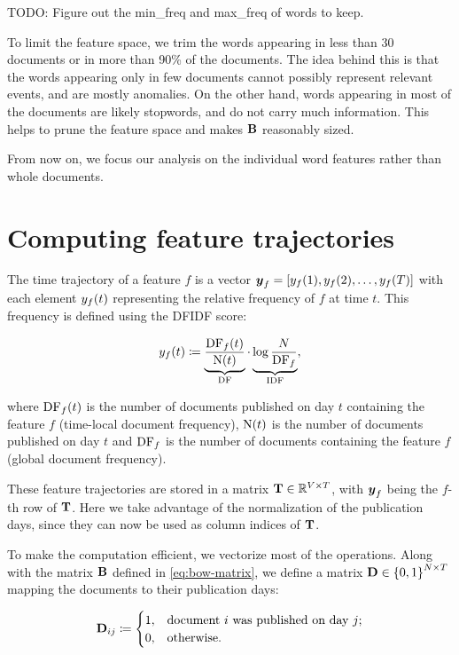 {\color{red} TODO: Figure out the min\_freq and max\_freq of words to keep.}

To limit the feature space, we trim the words appearing in less than 30 documents or in more than 90\% of the documents. The idea behind this is that the words appearing only in few documents cannot possibly represent relevant events, and are mostly anomalies. On the other hand, words appearing in most of the documents are likely stopwords, and do not carry much information. This helps to prune the feature space and makes $\mathbf{B}$ reasonably sized.

From now on, we focus our analysis on the individual word features rather than whole documents.


\section{Computing feature trajectories}
The time trajectory of a feature $f$ is a vector $\vect{\traj}_f = \left[ \traj_{f}(1), \traj_{f}(2), \dots, \traj_{f}(\streamlen) \right]$ with each element $y_{f}(t)$ representing the relative frequency of $f$ at time $t$. This frequency is defined using the DFIDF score:

\begin{equation}
	y_{f}(t) \coloneqq \underbrace{\frac{\text{DF}_{f}(t)}{\text{N}(t)}}_{\text{DF}} \cdot \underbrace{\log{\frac{N}{\text{DF}_{f}}}}_{\text{IDF}},
\end{equation}

where $\text{DF}_{f}(t)$ is the number of documents published on day $t$ containing the feature $f$ (time-local document frequency), $\text{N}(t)$ is the number of documents published on day $t$ and $\text{DF}_{f}$ is the number of documents containing the feature $f$ (global document frequency).

These feature trajectories are stored in a matrix $\mathbf{T} \in \mathbb{R}^{V \times T}$, with $\vect{\traj}_f$ being the $f$-th row of $\mathbf{T}$. Here we take advantage of the normalization of the publication days, since they can now be used as column indices of $\mathbf{T}$.

To make the computation efficient, we vectorize most of the operations. Along with the matrix $\mathbf{B}$ defined in \ref{eq:bow-matrix}, we define a matrix $\mathbf{D} \in \left\{ 0, 1 \right\}^{N \times T}$ mapping the documents to their publication days:

\begin{equation}
	\mathbf{D}_{ij} \coloneqq
	\begin{cases}
		1, & \text{document}~i~\text{was published on day}~j \text{;} \\
		0, & \text{otherwise}.
	\end{cases}
\end{equation}


